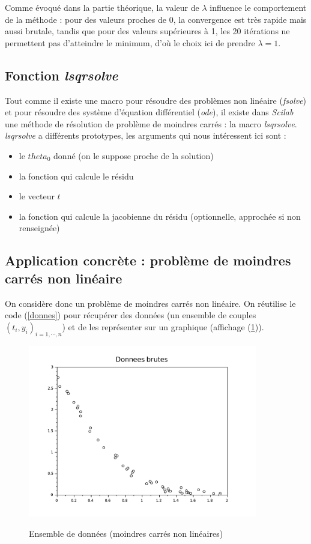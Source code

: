 \documentclass[a4paper,10pt]{report}
\begin{document}
Comme évoqué dans la partie théorique, la valeur de $\lambda$ influence le comportement de la méthode : pour des valeurs proches de 0, la convergence est très rapide mais aussi brutale, tandis que pour des valeurs supérieures à 1, les 20 itérations ne permettent pas d'atteindre le minimum, d'où le choix ici de prendre $\lambda=1$.

\subsection{Fonction \textit{lsqrsolve}}
Tout comme il existe une macro pour résoudre des problèmes non linéaire (\textit{fsolve}) et pour résoudre des système d'équation différentiel (\textit{ode}), il existe dans \textit{Scilab} une méthode de résolution de problème de moindres carrés : la macro \textit{lsqrsolve}.\\
\textit{lsqrsolve} a différents prototypes, les arguments qui nous intéressent ici sont :
\begin{itemize}
\item le $theta_0$ donné (on le suppose proche de la solution)
\item la fonction qui calcule le résidu
\item le vecteur $t$
\item la fonction qui calcule la jacobienne du résidu (optionnelle, approchée si non renseignée)
\end{itemize}

\newpage
\subsection{Application concrète : problème de moindres carrés non linéaire}
On considère donc un problème de moindres carrés non linéaire. On réutilise le code (\ref{donnes}) pour récupérer des données (un ensemble de couples $(t_i,y_i)_{i=1,\cdots,n}$) et de les représenter sur un graphique (affichage (\ref{donnes_graph2})).

\begin{figure}[H]
\centering
\caption{Ensemble de données (moindres carrés non linéaires)}
\includegraphics[width=10cm]{donnes_brutes2.pdf}
\label{donnes_graph2}
\end{figure}
\end{document}
